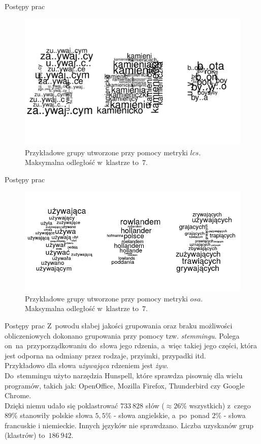 \documentclass[11pt,pdftex,mathserif]{beamer}\usepackage[]{graphicx}\usepackage[]{color}
\theoremstyle{definition}
\begin{document}
\begin{frame}{Postępy prac}
\begin{figure}[h]
      \centering
      \includegraphics[width=12cm] {lcs}
      \caption{Przykładowe grupy utworzone przy pomocy metryki $lcs$. Maksymalna odległość w~klastrze to~$7$.}
    \end{figure}
\end{frame}



\begin{frame}{Postępy prac}
\begin{figure}[h]
      \centering
      \includegraphics[width=12cm] {osa}
      \caption{Przykładowe grupy utworzone przy pomocy metryki $osa$. Maksymalna odległość w~klastrze to~$7$.}
    \end{figure}
\end{frame}



\begin{frame}{Postępy prac}
Z~powodu słabej jakości grupowania oraz braku możliwości obliczeniowych dokonano grupowania przy pomocy tzw. \emph{stemmingu}. Polega on~na~przyporządkowaniu do~słowa jego rdzenia, a~więc takiej jego części, która jest odporna na odmiany przez rodzaje, przyimki, przypadki itd.\\
Przykładowo dla słowa \emph{używająca} rdzeniem jest \emph{żyw}.\\
\pause
Do~stemmingu użyto narzędzia Hunspell, które sprawdza pisownię dla wielu programów, takich jak:  OpenOffice, Mozilla Firefox, Thunderbird czy Google Chrome.\\
Dzięki niemu udało się poklastrować $733\ 828$ słów ($\approx 26\%$ wszystkich) z~czego $89\%$ stanowiły polskie słowa $5,5\%$ - słowa angielskie, a~po~ponad $2\%$ - słowa francuskie i niemieckie. Innych języków nie sprawdzano. Liczba uzyskanów grup (klastrów) to~$186\ 942$.\\
\end{frame}
\end{document}
